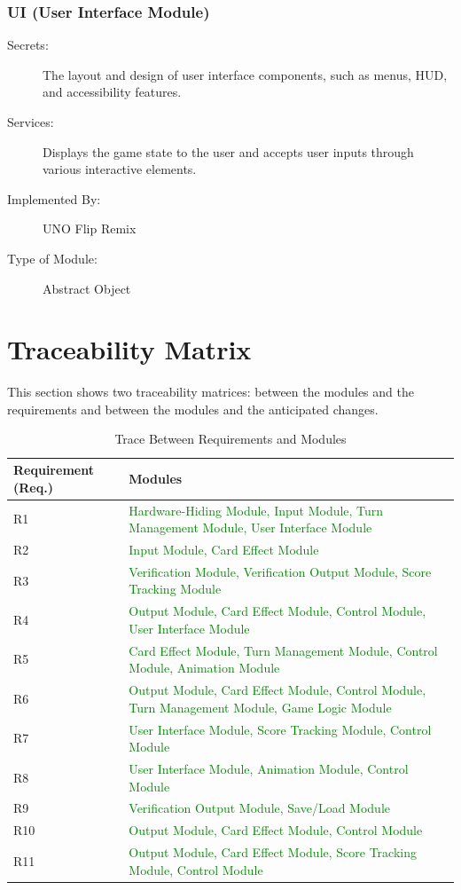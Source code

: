 \documentclass[12pt, titlepage]{article}
\newcommand{\added}[1]{\textcolor{green}{#1}}
\begin{document}
\subsubsection{UI (User Interface Module)} \label{mUI}

\begin{description}
\item[Secrets:] The layout and design of user interface components, such as menus, HUD, and accessibility features.
\item[Services:] Displays the game state to the user and accepts user inputs through various interactive elements.
\item[Implemented By:] UNO Flip Remix
\item[Type of Module:] Abstract Object
\end{description}

\section{Traceability Matrix} \label{SecTM}

This section shows two traceability matrices: between the modules and the
requirements and between the modules and the anticipated changes.

\begin{table}[H]
\centering
\begin{tabular}{p{} p{}}
\toprule
\textbf{Requirement (Req.)} & \textbf{Modules}\\
\midrule
R1 & \added{Hardware-Hiding Module, Input Module, Turn Management Module, User Interface Module}\\
R2 & \added{Input Module, Card Effect Module}\\
R3 & \added{Verification Module, Verification Output Module, Score Tracking Module}\\
R4 & \added{Output Module, Card Effect Module, Control Module, User Interface Module}\\
R5 & \added{Card Effect Module, Turn Management Module, Control Module, Animation Module}\\
R6 & \added{Output Module, Card Effect Module, Control Module, Turn Management Module, Game Logic Module}\\
R7 & \added{User Interface Module, Score Tracking Module, Control Module}\\
R8 & \added{User Interface Module, Animation Module, Control Module}\\
R9 & \added{Verification Output Module, Save/Load Module}\\
R10 & \added{Output Module, Card Effect Module, Control Module}\\
R11 & \added{Output Module, Card Effect Module, Score Tracking Module, Control Module}\\
\bottomrule
\end{tabular}
\caption{Trace Between Requirements and Modules}
\label{TblRT}
\end{table}
\end{document}
